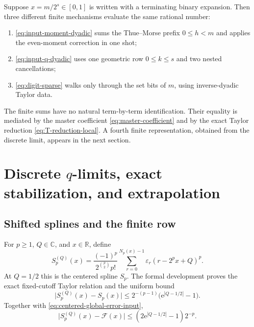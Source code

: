 \documentclass[11pt,oneside]{article}
\theoremstyle{definition}
\theoremstyle{remark}
\newcommand{\R}{\mathbb R}
\newcommand{\C}{\mathbb C}
\newcommand{\e}{\mathrm e}
\newcommand{\tm}{\varepsilon}
\begin{document}
Suppose $x=m/2^s\in[0,1]$ is written with a terminating binary expansion.  Then three different
finite mechanisms evaluate the same rational number:
\begin{enumerate}
\item \eqref{eq:input-moment-dyadic} sums the Thue--Morse prefix $0\le h<m$ and applies the
      even-moment correction in one shot;
\item \eqref{eq:input-q-dyadic} uses one geometric row $0\le k\le s$ and two nested
      cancellations;
\item \eqref{eq:digit-sparse} walks only through the set bits of $m$, using inverse-dyadic
      Taylor data.
\end{enumerate}
The finite sums have no natural term-by-term identification.  Their equality is mediated by
the master coefficient \eqref{eq:master-coefficient} and by the exact Taylor reduction
\eqref{eq:T-reduction-local}.  A fourth finite representation, obtained from the discrete
limit, appears in the next section.

\section[Discrete q-limits, exact stabilization, and extrapolation]{Discrete $q$-limits, exact stabilization, and extrapolation}
\label{sec:discrete}

\subsection{Shifted splines and the finite row}

For $p\ge1$, $Q\in\C$, and $x\in\R$, define
\begin{equation}
 S_p^{(Q)}(x)=
 \frac{(-1)^p}{2^{\binom p2}p!}
 \sum_{r=0}^{N_p(x)-1}\tm_r(r-2^px+Q)^p.                  \label{eq:shifted-spline-local}
\end{equation}
At $Q=1/2$ this is the centered spline $S_p$.  The formal development proves the exact
fixed-cutoff Taylor relation and the uniform bound
\begin{equation}
 \bigl|S_p^{(Q)}(x)-S_p(x)\bigr|
 \le2^{-(p-1)}\bigl(\e^{|Q-1/2|}-1\bigr).                 \label{eq:shifted-spline-bound-local}
\end{equation}
Together with \eqref{eq:centered-global-error-input},
\begin{equation}
 \bigl|S_p^{(Q)}(x)-\mathcal F(x)\bigr|
 \le(2\e^{|Q-1/2|}-1)2^{-p}.                              \label{eq:shifted-total-error}
\end{equation}
\end{document}
